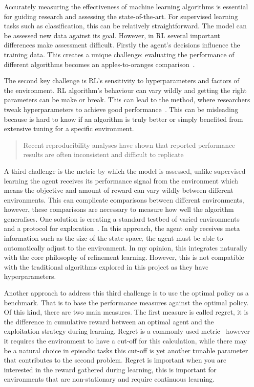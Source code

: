 \documentclass[]{final_report}
\begin{document}
Accurately measuring the effectiveness of machine learning algorithms is essential for guiding research and assessing the state-of-the-art. For supervised learning tasks such as classification, this can be relatively straightforward. The model can be assessed new data against its goal. However, in RL several important differences make assessment difficult. Firstly the agent's decisions influence the training data.  This creates a unique challenge: evaluating the performance of different algorithms becomes an apples-to-oranges comparison~\cite{sutton2018reinforcement}.

The second key challenge is RL's sensitivity to hyperparameters and factors of the environment. RL algorithm's behaviour can vary wildly and getting the right parameters can be make or break. This can lead to the  method, where researchers tweak hyperparameters to achieve good performance~\cite{evaluatingRL}. This can be misleading because is hard to know if an algorithm is truly better or simply benefited from extensive tuning for a specific environment. 

\begin{quote}
  Recent reproducibility analyses have shown that reported performance results are often inconsistent and difficult to replicate~\cite{evaluatingRL}
\end{quote}

\newpage
A third challenge is the metric by which the model is assessed, unlike supervised learning the agent receives its performance signal from the environment which means the objective and amount of reward can vary wildly between different environments. This can complicate comparisons between different environments, however, these comparisons are necessary to measure how well the algorithm generalises. One solution is creating a standard testbed of varied environments and a protocol for exploration~\cite{assessingDeepRL}\cite{evaluatingRL}. In this approach, the agent only receives meta information such as the size of the state space, the agent must be able to automatically adjust to the environment. In my opinion, this integrates naturally with the core philosophy of refinement learning. However, this is not compatible with the traditional algorithms explored in this project as they have hyperparameters.

Another approach to address this third challenge is to use the optimal policy as a benchmark. That is to base the performance measures against the optimal policy. Of this kind, there are two main measures. The first measure is called regret, it is the difference in cumulative reward between an optimal agent and the exploitation strategy during learning. Regret is a commonly used metric~\cite{modelFree} however it requires the environment to have a cut-off for this calculation, while there may be a natural choice in episodic tasks this cut-off is yet another tunable parameter that contributes to the second problem. Regret is important when you are interested in the reward gathered during learning, this is important for environments that are non-stationary and require continuous learning.
\end{document}
